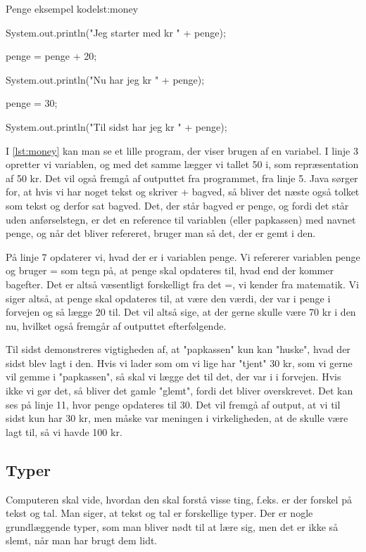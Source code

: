 {\begin{JavaCode}{Penge eksempel kode}{lst:money}
{{		System.out.println("Jeg starter med kr " + penge);
		
		penge = penge + 20;
		
		System.out.println("Nu har jeg kr " + penge);
		
		penge = 30;
		
		System.out.println("Til sidst har jeg kr " + penge);
	}
}
\end{JavaCode}

I \autoref{lst:money} kan man se et lille program, der viser brugen af en variabel. I linje 3 opretter vi variablen, og med det samme lægger vi tallet 50 i, som repræsentation af 50 kr. Det vil også fremgå af outputtet fra programmet, fra linje 5. Java sørger for, at hvis vi har noget tekst og skriver + bagved, så bliver det næste også tolket som tekst og derfor sat bagved. Det, der står bagved er penge, og fordi det står uden anførselstegn, er det en reference til variablen (eller papkassen) med navnet penge, og når det bliver refereret, bruger man så det, der er gemt i den.

På linje 7 opdaterer vi, hvad der er i variablen penge. Vi refererer variablen penge og bruger = som tegn på, at penge skal opdateres til, hvad end der kommer bagefter. Det er altså væsentligt forskelligt fra det =, vi kender fra matematik. Vi siger altså, at penge skal opdateres til, at være den værdi, der var i penge i forvejen og så lægge 20 til. Det vil altså sige, at der gerne skulle være 70 kr i den nu, hvilket også fremgår af outputtet efterfølgende.

Til sidst demonstreres vigtigheden af, at "papkassen" kun kan "huske", hvad der sidst blev lagt i den. Hvis vi lader som om vi lige har "tjent" 30 kr, som vi gerne vil gemme i "papkassen", så skal vi lægge det til det, der var i i forvejen. Hvis ikke vi gør det, så bliver det gamle "glemt", fordi det bliver overskrevet. Det kan ses på linje 11, hvor penge opdateres til 30. Det vil fremgå af output, at vi til sidst kun har 30 kr, men måske var meningen i virkeligheden, at de skulle være lagt til, så vi havde 100 kr.

\subsection{Typer}
Computeren skal vide, hvordan den skal forstå visse ting, f.eks. er der forskel på tekst og tal. Man siger, at tekst og tal er forskellige typer. Der er nogle grundlæggende typer, som man bliver nødt til at lære sig, men det er ikke så slemt, når man har brugt dem lidt.

}
